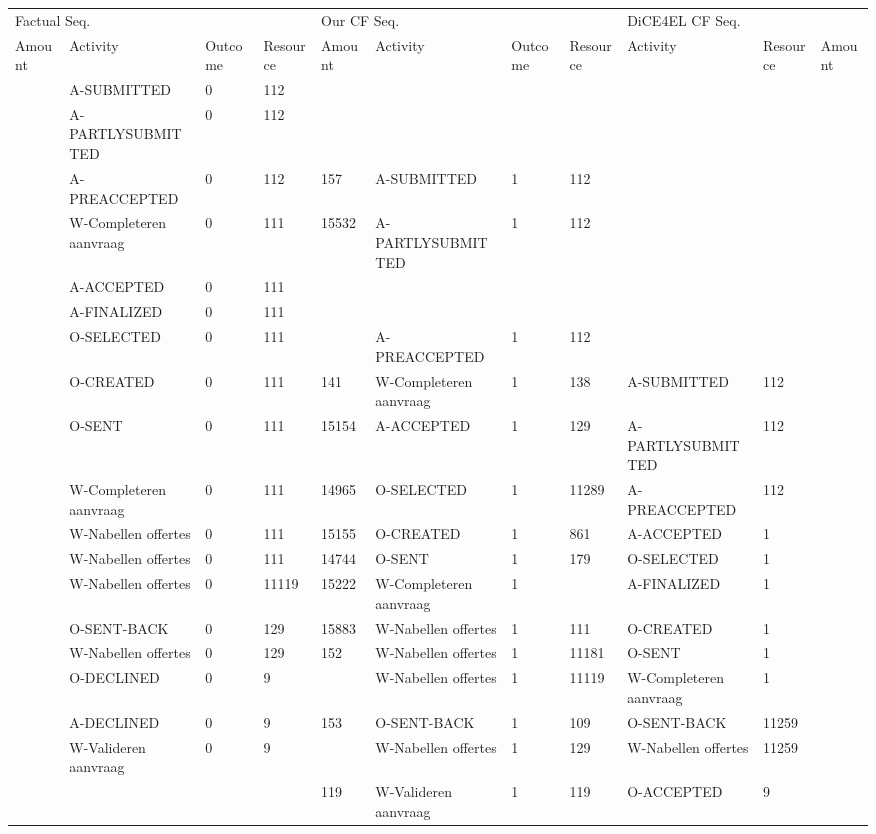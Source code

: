 \begin{tabular}{lllllllllll}
\toprule
\multicolumn{4}{l}{Factual Seq.} & \multicolumn{4}{l}{Our CF Seq.} & \multicolumn{3}{l}{DiCE4EL CF Seq.} \\
Amount & Activity & Outcome & Resource & Amount & Activity & Outcome & Resource & Activity & Resource & Amount \\
\midrule
 & A-SUBMITTED & 0 & 112 &  &  &  &  &  &  &  \\
 & A-PARTLYSUBMITTED & 0 & 112 &  &  &  &  &  &  &  \\
 & A-PREACCEPTED & 0 & 112 & 157 & A-SUBMITTED & 1 & 112 &  &  &  \\
 & W-Completeren aanvraag & 0 & 111 & 15532 & A-PARTLYSUBMITTED & 1 & 112 &  &  &  \\
 & A-ACCEPTED & 0 & 111 &  &  &  &  &  &  &  \\
 & A-FINALIZED & 0 & 111 &  &  &  &  &  &  &  \\
 & O-SELECTED & 0 & 111 &  & A-PREACCEPTED & 1 & 112 &  &  &  \\
 & O-CREATED & 0 & 111 & 141 & W-Completeren aanvraag & 1 & 138 & A-SUBMITTED & 112 &  \\
 & O-SENT & 0 & 111 & 15154 & A-ACCEPTED & 1 & 129 & A-PARTLYSUBMITTED & 112 &  \\
 & W-Completeren aanvraag & 0 & 111 & 14965 & O-SELECTED & 1 & 11289 & A-PREACCEPTED & 112 &  \\
 & W-Nabellen offertes & 0 & 111 & 15155 & O-CREATED & 1 & 861 & A-ACCEPTED & 1 &  \\
 & W-Nabellen offertes & 0 & 111 & 14744 & O-SENT & 1 & 179 & O-SELECTED & 1 &  \\
 & W-Nabellen offertes & 0 & 11119 & 15222 & W-Completeren aanvraag & 1 &  & A-FINALIZED & 1 &  \\
 & O-SENT-BACK & 0 & 129 & 15883 & W-Nabellen offertes & 1 & 111 & O-CREATED & 1 &  \\
 & W-Nabellen offertes & 0 & 129 & 152 & W-Nabellen offertes & 1 & 11181 & O-SENT & 1 &  \\
 & O-DECLINED & 0 & 9 &  & W-Nabellen offertes & 1 & 11119 & W-Completeren aanvraag & 1 &  \\
 & A-DECLINED & 0 & 9 & 153 & O-SENT-BACK & 1 & 109 & O-SENT-BACK & 11259 &  \\
 & W-Valideren aanvraag & 0 & 9 &  & W-Nabellen offertes & 1 & 129 & W-Nabellen offertes & 11259 &  \\
 &  &  &  & 119 & W-Valideren aanvraag & 1 & 119 & O-ACCEPTED & 9 &  \\
\bottomrule
\end{tabular}
